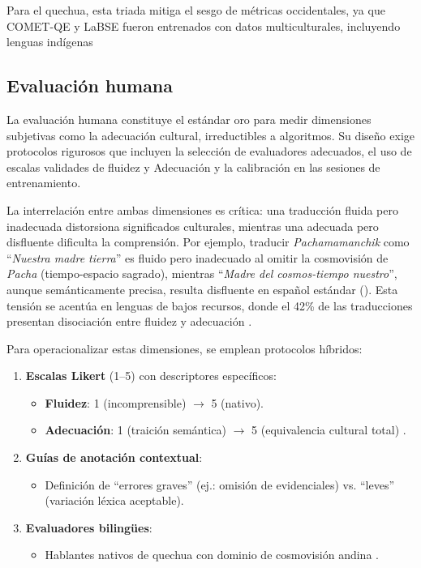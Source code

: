         Para el quechua, esta triada mitiga el sesgo de métricas occidentales, ya que COMET-QE y LaBSE fueron entrenados con datos multiculturales, incluyendo lenguas indígenas 
        
        \subsection{Evaluación humana}
        La evaluación humana constituye el estándar oro para medir dimensiones subjetivas como la adecuación cultural, irreductibles a algoritmos. Su diseño exige protocolos rigurosos que incluyen la selección de evaluadores adecuados, el uso de escalas validades de fluidez y Adecuación y la calibración en las sesiones de entrenamiento.

        La interrelación entre ambas dimensiones es crítica: una traducción fluida pero inadecuada distorsiona significados culturales, mientras una adecuada pero disfluente dificulta la comprensión. Por ejemplo, traducir \textit{Pachamamanchik} como ``\textit{Nuestra madre tierra}'' es fluido pero inadecuado al omitir la cosmovisión de \textit{Pacha} (tiempo-espacio sagrado), mientras ``\textit{Madre del cosmos-tiempo nuestro}'', aunque semánticamente precisa, resulta disfluente en español estándar (\cite{rios2015basic}). Esta tensión se acentúa en lenguas de bajos recursos, donde el 42\% de las traducciones presentan disociación entre fluidez y adecuación \cite{neubig2018rapid}.

        Para operacionalizar estas dimensiones, se emplean protocolos híbridos:
        
        \begin{enumerate}[label=\textbf{\arabic*.}]
            \item \textbf{Escalas Likert} (1--5) con descriptores específicos:
            \begin{itemize}
                \item \textbf{Fluidez}: 1 (incomprensible) $\rightarrow$ 5 (nativo).
                \item \textbf{Adecuación}: 1 (traición semántica) $\rightarrow$ 5 (equivalencia cultural total) \cite{lommel2018translation}.
            \end{itemize}
        
            \item \textbf{Guías de anotación contextual}:
            \begin{itemize}
                \item Definición de ``errores graves'' (ej.: omisión de evidenciales) vs. ``leves'' (variación léxica aceptable).
            \end{itemize}
        
            \item \textbf{Evaluadores bilingües}:
            \begin{itemize}
                \item Hablantes nativos de quechua con dominio de cosmovisión andina \cite{bird2020}.
            \end{itemize}
        \end{enumerate}
        
